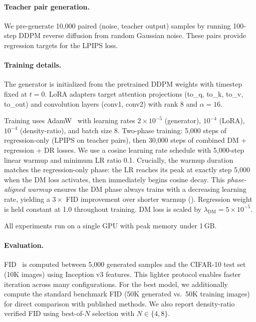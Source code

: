 \documentclass{article}
\theoremstyle{plain}
\theoremstyle{remark}
\begin{document}
\paragraph{Teacher pair generation.}
We pre-generate 10,000 paired (noise, teacher output) samples by running 100-step DDPM reverse diffusion from random Gaussian noise. These pairs provide regression targets for the LPIPS loss.

\paragraph{Training details.}
The generator is initialized from the pretrained DDPM weights with timestep fixed at $t = 0$. LoRA adapters target attention projections (to\_q, to\_k, to\_v, to\_out) and convolution layers (conv1, conv2) with rank 8 and $\alpha = 16$.

Training uses AdamW~\citep{loshchilov2019decoupled} with learning rates $2 \times 10^{-5}$ (generator), $10^{-4}$ (LoRA), $10^{-4}$ (density-ratio), and batch size 8. Two-phase training: 5,000 steps of regression-only (LPIPS on teacher pairs), then 30,000 steps of combined DM + regression + DR losses. We use a cosine learning rate schedule with 5,000-step linear warmup and minimum LR ratio 0.1. Crucially, the warmup duration matches the regression-only phase: the LR reaches its peak at exactly step 5,000 when the DM loss activates, then immediately begins cosine decay. This \emph{phase-aligned warmup} ensures the DM phase always trains with a decreasing learning rate, yielding a $3{\times}$ FID improvement over shorter warmup (). Regression weight is held constant at 1.0 throughout training. DM loss is scaled by $\lambda_{\text{DM}} = 5 \times 10^{-5}$.

All experiments run on a single GPU with peak memory under 1\,GB.

\paragraph{Evaluation.}
FID~\citep{heusel2017gans} is computed between 5,000 generated samples and the CIFAR-10 test set (10K images) using Inception v3 features. This lighter protocol enables faster iteration across many configurations. For the best model, we additionally compute the standard benchmark FID (50K generated vs.\ 50K training images) for direct comparison with published methods. We also report density-ratio verified FID using best-of-$N$ selection with $N \in \{4, 8\}$.
\end{document}
